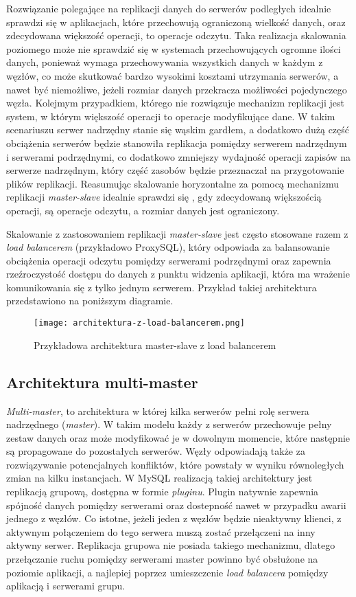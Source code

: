 Rozwiązanie polegające na replikacji danych do serwerów podległych idealnie sprawdzi się w aplikacjach, które przechowują ograniczoną wielkość danych, oraz zdecydowana większość operacji, to operacje odczytu. Taka realizacja skalowania poziomego może nie sprawdzić się w systemach przechowujących ogromne ilości danych, ponieważ wymaga przechowywania wszystkich danych w każdym z węzłów, co może skutkować bardzo wysokimi kosztami utrzymania serwerów, a nawet być niemożliwe, jeżeli rozmiar danych przekracza możliwości pojedynczego węzła. Kolejmym przypadkiem, którego nie rozwiązuje mechanizm replikacji jest system, w którym większość operacji to operacje modyfikujące dane. W takim scenariuszu serwer nadrzędny stanie się wąskim gardłem, a dodatkowo dużą część obciążenia serwerów będzie stanowiła replikacja pomiędzy serwerem nadrzędnym i serwerami podrzędnymi, co dodatkowo zmniejszy wydajność operacji zapisów na serwerze nadrzędnym, który część zasobów będzie przeznaczał na przygotowanie plików replikacji. Reasumując skalowanie horyzontalne za pomocą mechanizmu replikacji \textit{master-slave} idealnie sprawdzi się , gdy zdecydowaną większością operacji, są operacje odczytu, a rozmiar danych jest ograniczony.

Skalowanie z zastosowaniem replikacji \textit{master-slave} jest często stosowane razem z \textit{load balancerem} (przykładowo ProxySQL), który odpowiada za balansowanie obciążenia operacji odczytu pomiędzy serwerami podrzędnymi oraz zapewnia rzeźroczystość dostępu do danych z punktu widzenia aplikacji, która ma wrażenie komunikowania się z tylko jednym serwerem. Przykład takiej architektura przedstawiono na poniższym diagramie.

\begin{figure}[!h]
	\caption{Przykładowa architektura master-slave z load balancerem}
	\centering
	\texttt{[image: architektura-z-load-balancerem.png]}
	\label{fig:label}
\end{figure}

\subsection{Architektura multi-master}
\textit{Multi-master}, to architektura w której kilka serwerów pełni rolę serwera nadrzędnego (\textit{master}). W takim modelu każdy z serwerów przechowuje pełny zestaw danych oraz może modyfikować je w dowolnym momencie, które następnie są propagowane do pozostałych serwerów. Węzły odpowiadają także za rozwiązywanie potencjalnych konfliktów, które powstały w wyniku równoległych zmian na kilku instancjach. W MySQL realizacją takiej architektury jest replikacją grupową, dostępna w formie \textit{pluginu}. Plugin natywnie zapewnia spójność danych pomiędzy serwerami oraz dostepność nawet w przypadku awarii jednego z węzłów. Co istotne, jeżeli jeden z węzłów będzie nieaktywny klienci, z aktywnym połączeniem do tego serwera muszą zostać przełączeni na inny aktywny serwer. Replikacja grupowa nie posiada takiego mechanizmu, dlatego przełączanie ruchu pomiędzy serwerami master powinno być obsłużone na poziomie aplikacji, a najlepiej poprzez umieszczenie \textit{load balancera} pomiędzy aplikacją i serwerami grupu.

